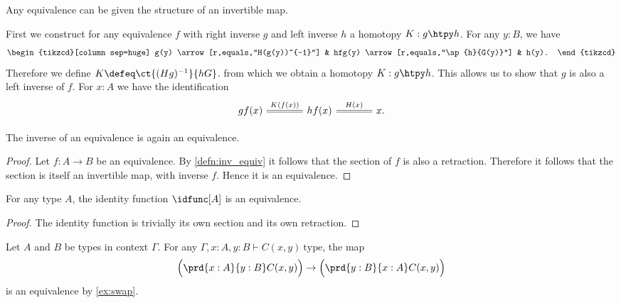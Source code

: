 \begin{defn}\label{defn:inv_equiv}
Any equivalence can be given the structure of an invertible map.
\end{defn}

\begin{constr}
First we construct for any equivalence $f$ with right inverse $g$ and left inverse $h$ a homotopy $K:g\htpy h$. For any $y:B$, we have 
\begin{equation*}
\begin{tikzcd}[column sep=huge]
g(y) \arrow[r,equals,"H(g(y))^{-1}"] & hfg(y) \arrow[r,equals,"\ap{h}{G(y)}"] & h(y).
\end{tikzcd}
\end{equation*} 
Therefore we define $K\defeq \ct{(Hg)^{-1}}{hG}$.
from which we obtain a homotopy $K:g\htpy h$.
This allows us to show that $g$ is also a left inverse of $f$. For $x:A$ we have the identification
\begin{equation*}
\begin{tikzcd}[column sep=large]
gf(x) \arrow[r,equals,"K(f(x))"] & hf(x) \arrow[r,equals,"H(x)"] & x.
\end{tikzcd}\qedhere
\end{equation*}
\end{constr}

\begin{cor}
The inverse of an equivalence is again an equivalence.
\end{cor}

\begin{proof}
Let $f:A\to B$ be an equivalence. By \cref{defn:inv_equiv} it follows that the section of $f$ is also a retraction. Therefore it follows that the section is itself an invertible map, with inverse $f$. Hence it is an equivalence.
\end{proof}

\begin{thm}\label{thm:id_equiv}
For any type $A$, the identity function $\idfunc[A]$ is an equivalence.
\end{thm}

\begin{proof}
The identity function is trivially its own section and its own retraction.
\end{proof}

\begin{eg}
Let $A$ and $B$ be types in context $\Gamma$. 
For any $\Gamma,x:A,y:B\vdash C(x,y)~\mathrm{type}$, the map
\begin{equation*}
\Big(\prd{x:A}{y:B}C(x,y)\Big)\to\Big(\prd{y:B}{x:A}C(x,y)\Big)
\end{equation*}
is an equivalence by \cref{ex:swap}.
\end{eg}

